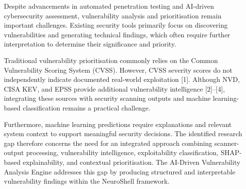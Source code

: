 \documentclass[
]{article}
\begin{document}
Despite advancements in automated penetration testing and AI-driven
cybersecurity assessment, vulnerability analysis and prioritisation
remain important challenges. Existing security tools primarily focus on
discovering vulnerabilities and generating technical findings, which
often require further interpretation to determine their significance and
priority.

Traditional vulnerability prioritisation commonly relies on the Common
Vulnerability Scoring System (CVSS). However, CVSS severity scores do
not independently indicate documented real-world exploitation {[}1{]}.
Although NVD, CISA KEV, and EPSS provide additional vulnerability
intelligence {[}2{]}--{[}4{]}, integrating these sources with security
scanning outputs and machine learning-based classification remains a
practical challenge.

Furthermore, machine learning predictions require explanations and
relevant system context to support meaningful security decisions. The
identified research gap therefore concerns the need for an integrated
approach combining scanner-output processing, vulnerability
intelligence, exploitability classification, SHAP-based explainability,
and contextual prioritisation. The AI-Driven Vulnerability Analysis
Engine addresses this gap by producing structured and interpretable
vulnerability findings within the NeuroShell framework.
\end{document}
